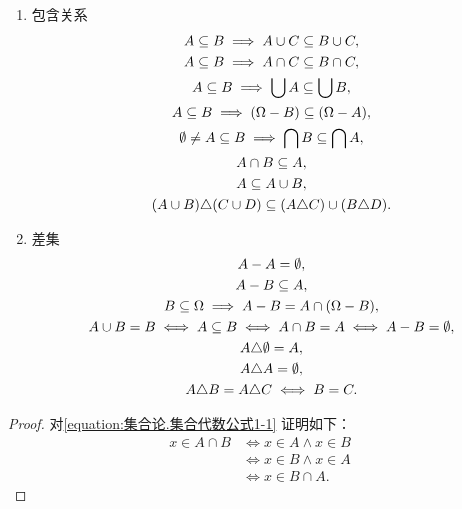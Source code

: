 \begin{property}
\begin{enumerate}
\item 包含关系
\begin{gather}
	A \subseteq B \implies A \cup C \subseteq B \cup C, \label{equation:集合论.集合代数公式6-1} \\
	A \subseteq B \implies A \cap C \subseteq B \cap C, \label{equation:集合论.集合代数公式6-2} \\
	A \subseteq B \implies \bigcup A \subseteq \bigcup B, \label{equation:集合论.集合代数公式6-3} \\
	A \subseteq B \implies (\Omega - B) \subseteq (\Omega - A), \label{equation:集合论.集合代数公式6-4} \\
	\emptyset \neq A \subseteq B \implies \bigcap B \subseteq \bigcap A, \label{equation:集合论.集合代数公式6-5} \\
	A \cap B \subseteq A, \\
	A \subseteq A \cup B, \\
	(A \cup B) \triangle (C \cup D) \subseteq (A \triangle C) \cup (B \triangle D).
\end{gather}

\item 差集
\begin{gather}
	A - A = \emptyset, \\
	A - B \subseteq A, \\
	B \subseteq \Omega
	\implies
	A - B = A \cap (\Omega - B), \\
	A \cup B = B
		\iff A \subseteq B
		\iff A \cap B = A
		\iff A - B = \emptyset, \label{equation:集合论.集合代数公式7-3} \\
	A \triangle \emptyset = A, \\
	A \triangle A = \emptyset, \\
	A \triangle B = A \triangle C
		\iff B = C.
\end{gather}
\end{enumerate}
\begin{proof}
对\cref{equation:集合论.集合代数公式1-1} 证明如下：
\begin{align*}
	x \in A \cap B
	&\iff x \in A \land x \in B \\
	&\iff x \in B \land x \in A \\
	&\iff x \in B \cap A.
\end{align*}


\end{proof}
\end{property}
